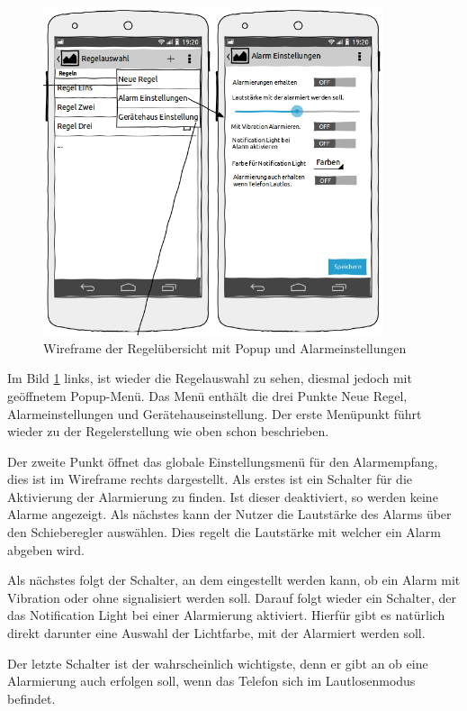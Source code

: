 \begin{figure}
\vspace{-13pt}
\includegraphics[width=10cm]{Bilder/WireframeRegeluebersicht_popup.png}
\caption{Wireframe der Regel\"ubersicht mit Popup und Alarmeinstellungen}
\label{Wireframe Regeluebersicht Popup}
\vspace{-20pt}
\end{figure}
Im Bild \ref{Wireframe Regeluebersicht Popup} links, ist wieder die Regelauswahl zu sehen, diesmal jedoch mit ge\"offnetem Popup-Men\"u. Das Men\"u enth\"alt die drei Punkte Neue Regel, Alarmeinstellungen und Ger\"atehauseinstellung. Der erste Men\"upunkt f\"uhrt wieder zu der Regelerstellung wie oben schon beschrieben. 

Der zweite Punkt \"offnet das globale Einstellungsmen\"u f\"ur den Alarmempfang, dies ist im Wireframe rechts dargestellt. Als erstes ist ein Schalter f\"ur die Aktivierung der Alarmierung zu finden. Ist dieser deaktiviert, so werden keine Alarme angezeigt. Als n\"achstes kann der Nutzer die Lautst\"arke des Alarms \"uber den Schieberegler ausw\"ahlen. Dies regelt die Lautst\"arke mit welcher ein Alarm abgeben wird.

Als n\"achstes folgt der Schalter, an dem eingestellt werden kann, ob ein Alarm mit Vibration oder ohne signalisiert werden soll. Darauf folgt wieder ein Schalter, der das Notification Light bei einer Alarmierung aktiviert. Hierf\"ur gibt es nat\"urlich direkt darunter eine Auswahl der Lichtfarbe, mit der Alarmiert werden soll.

Der letzte Schalter ist der wahrscheinlich wichtigste, denn er gibt an ob eine Alarmierung auch erfolgen soll, wenn das Telefon sich im Lautlosenmodus befindet.

